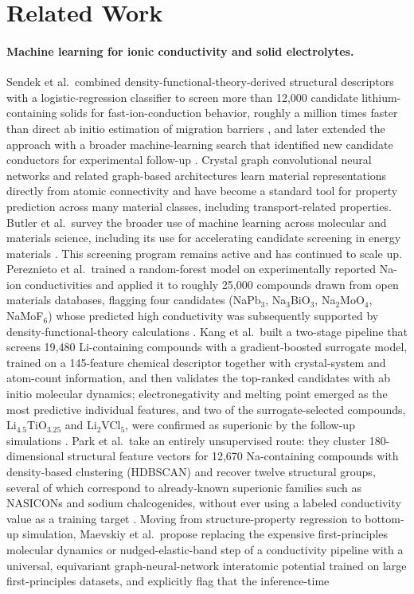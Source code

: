 \documentclass[11pt]{article}
\begin{document}
\section{Related Work}

\paragraph{Machine learning for ionic conductivity and solid electrolytes.} Sendek et al.\ combined density-functional-theory-derived structural descriptors with a logistic-regression classifier to screen more than 12{,}000 candidate lithium-containing solids for fast-ion-conduction behavior, roughly a million times faster than direct ab initio estimation of migration barriers \citep{sendek2017holistic}, and later extended the approach with a broader machine-learning search that identified new candidate conductors for experimental follow-up \citep{sendek2018mldiscovery}. Crystal graph convolutional neural networks \citep{xie2018cgcnn} and related graph-based architectures learn material representations directly from atomic connectivity and have become a standard tool for property prediction across many material classes, including transport-related properties. Butler et al.\ survey the broader use of machine learning across molecular and materials science, including its use for accelerating candidate screening in energy materials \citep{butler2018mlmaterials}. This screening program remains active and has continued to scale up. Pereznieto et al.\ trained a random-forest model on experimentally reported Na-ion conductivities and applied it to roughly 25{,}000 compounds drawn from open materials databases, flagging four candidates (NaPb$_3$, Na$_3$BiO$_3$, Na$_2$MoO$_4$, NaMoF$_6$) whose predicted high conductivity was subsequently supported by density-functional-theory calculations \citep{pereznieto2023naion}. Kang et al.\ built a two-stage pipeline that screens 19{,}480 Li-containing compounds with a gradient-boosted surrogate model, trained on a 145-feature chemical descriptor together with crystal-system and atom-count information, and then validates the top-ranked candidates with ab initio molecular dynamics; electronegativity and melting point emerged as the most predictive individual features, and two of the surrogate-selected compounds, Li$_{4.5}$TiO$_{3.25}$ and Li$_2$VCl$_5$, were confirmed as superionic by the follow-up simulations \citep{kang2023superionic}. Park et al.\ take an entirely unsupervised route: they cluster 180-dimensional structural feature vectors for 12{,}670 Na-containing compounds with density-based clustering (HDBSCAN) and recover twelve structural groups, several of which correspond to already-known superionic families such as NASICONs and sodium chalcogenides, without ever using a labeled conductivity value as a training target \citep{park2024naunsupervised}. Moving from structure-property regression to bottom-up simulation, Maevskiy et al.\ propose replacing the expensive first-principles molecular dynamics or nudged-elastic-band step of a conductivity pipeline with a universal, equivariant graph-neural-network interatomic potential trained on large first-principles datasets, and explicitly flag that the inference-time 
\end{document}
